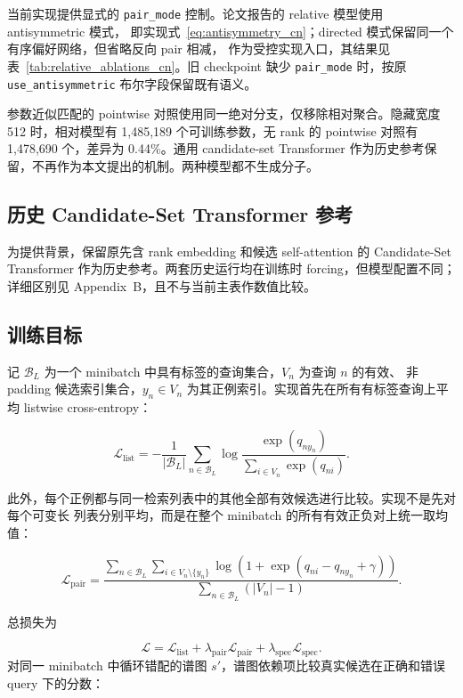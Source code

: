 \documentclass[UTF8,11pt]{ctexart}
\begin{document}
当前实现提供显式的 \texttt{pair\_mode} 控制。论文报告的 relative 模型使用 antisymmetric 模式，
即实现式~\ref{eq:antisymmetry_cn}；directed 模式保留同一个有序偏好网络，但省略反向 pair 相减，
作为受控实现入口，其结果见表~\ref{tab:relative_ablations_cn}。旧 checkpoint 缺少
\texttt{pair\_mode} 时，按原 \texttt{use\_antisymmetric} 布尔字段保留既有语义。

参数近似匹配的 pointwise 对照使用同一绝对分支，仅移除相对聚合。隐藏宽度 512 时，相对模型有
1,485,189 个可训练参数，无 rank 的 pointwise 对照有 1,478,690 个，差异为 0.44\%。通用
candidate-set Transformer 作为历史参考保留，不再作为本文提出的机制。两种模型都不生成分子。

\subsection{历史 Candidate-Set Transformer 参考}

为提供背景，保留原先含 rank embedding 和候选 self-attention 的 Candidate-Set Transformer
\cite{vaswani2017attention} 作为历史参考。两套历史运行均在训练时 forcing，但模型配置不同；
详细区别见 Appendix~B，且不与当前主表作数值比较。

\subsection{训练目标}

记 $\mathcal{B}_{L}$ 为一个 minibatch 中具有标签的查询集合，$V_n$ 为查询 $n$ 的有效、
非 padding 候选索引集合，$y_n\in V_n$ 为其正例索引。实现首先在所有有标签查询上平均
listwise cross-entropy：

\begin{equation}
  \mathcal{L}_{\mathrm{list}}
  =-\frac{1}{|\mathcal{B}_{L}|}
  \sum_{n\in\mathcal{B}_{L}}
  \log\frac{\exp(q_{ny_n})}{\sum_{i\in V_n}\exp(q_{ni})}.
\end{equation}

此外，每个正例都与同一检索列表中的其他全部有效候选进行比较。实现不是先对每个可变长
列表分别平均，而是在整个 minibatch 的所有有效正负对上统一取均值：

\begin{equation}
  \mathcal{L}_{\mathrm{pair}}
  =\frac{
  \sum_{n\in\mathcal{B}_{L}}\sum_{i\in V_n\setminus\{y_n\}}
  \log\!\left(1+\exp(q_{ni}-q_{ny_n}+\gamma)\right)}
  {\sum_{n\in\mathcal{B}_{L}}\left(|V_n|-1\right)}.
\end{equation}

总损失为

\begin{equation}
  \mathcal{L}
  =\mathcal{L}_{\mathrm{list}}
  +\lambda_{\mathrm{pair}}\mathcal{L}_{\mathrm{pair}}
  +\lambda_{\mathrm{spec}}\mathcal{L}_{\mathrm{spec}}.
\end{equation}
对同一 minibatch 中循环错配的谱图 $s'$，谱图依赖项比较真实候选在正确和错误 query 下的分数：
\end{document}
